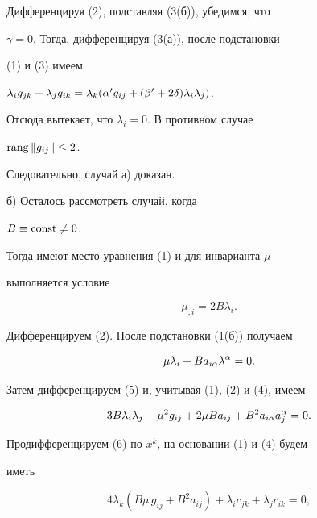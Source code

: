 \begin{pf}
Дифференцируя (2), подставляя (3(б)), убедимся, что


$\gamma=0$. Тогда, дифференцируя (3(а)), после подстановки


(1) и (3) имеем


$\lambda_i g_{jk}+\lambda_j g_{ik}=\lambda_k


(\a'g_{ij}+(\b'+2\delta)\lambda_i\lambda_j)$.


Отсюда вытекает, что $\lambda_i=0$. В противном случае 


$\operatorname{rang}\| g_{ij}\|\leq2$. 


Следовательно, случай а) доказан.





б) Осталось рассмотреть случай, когда


$B\equiv\operatorname{const}\neq0$. 


Тогда имеют место уравнения (1) и для инварианта $\mu$


выполняется условие


\begin{equation}


\mu_{,i}=2B\lambda_i.


\end{equation}





Дифференцируем (2). После подстановки (1(б)) получаем


\begin{equation}


\mu\lambda_i+B a_{i\a}\lambda^\a=0. 


\end{equation}


Затем дифференцируем (5) и, учитывая (1), (2) и (4), имеем


\begin{equation}


3B\lambda_i\lambda_j+\mu^2g_{ij}+2\mu B a_{ij}+B^2 a_{i\a}a^\a_j=0.


\end{equation}


Продифференцируем (6) по $x^k$, на основании (1) и (4) будем


иметь 


\begin{equation}


4\lambda_k(B\mu\,g_{ij}+ B^2 a_{ij})+\lambda_i c_{jk}+


\lambda_j c_{ik} =0,


\end{equation}



\end{pf}
